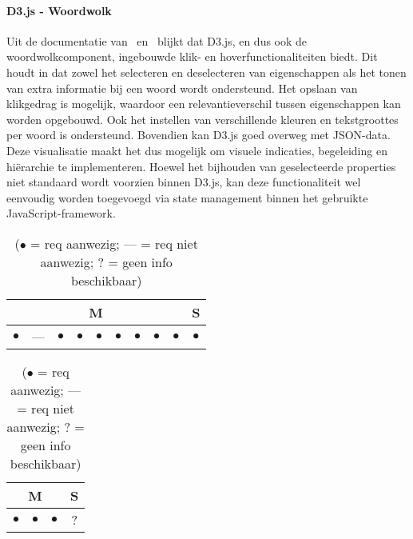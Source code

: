 \paragraph{D3.js - Woordwolk}
Uit de documentatie van~\textcite{D3Contributors2025} en~\textcite{Mike2025} blijkt dat D3.js, en dus ook de woordwolkcomponent, ingebouwde klik- en hoverfunctionaliteiten biedt. Dit houdt in dat zowel het selecteren en deselecteren van eigenschappen als het tonen van extra informatie bij een woord wordt ondersteund. Het opslaan van klikgedrag is mogelijk, waardoor een relevantieverschil tussen eigenschappen kan worden opgebouwd. Ook het instellen van verschillende kleuren en tekstgroottes per woord is ondersteund. Bovendien kan D3.js goed overweg met JSON-data. Deze visualisatie maakt het dus mogelijk om visuele indicaties, begeleiding en hiërarchie te implementeren. Hoewel het bijhouden van geselecteerde properties niet standaard wordt voorzien binnen D3.js, kan deze functionaliteit wel eenvoudig worden toegevoegd via state management binnen het gebruikte JavaScript-framework.

\begin{table}[htbp]
    \centering
    \begin{minipage}{0.48\textwidth}
        \centering
        \begin{tabular}{|ccccccccc|c|}
            \hline
            \multicolumn{9}{|c|}{M} & \multicolumn{1}{c|}{S} \\
            \midrule
            $\bullet$ & --- & $\bullet$ & $\bullet$ & $\bullet$ & $\bullet$ & $\bullet$ & $\bullet$ & $\bullet$ & $\bullet$ \\
            \bottomrule
        \end{tabular}
        \caption{D3.js Woordwolk - Functionele requirements}
    \end{minipage}
    \hfill
    \begin{minipage}{0.48\textwidth}
        \centering
        \begin{tabular}{|ccc|c|}
            \hline
            \multicolumn{3}{|c|}{M} & \multicolumn{1}{c|}{S} \\
            \midrule
            $\bullet$ & $\bullet$ & $\bullet$ & ? \\
            \bottomrule
        \end{tabular}
        \caption{D3.js Woordwolk - Niet-functionele requirements}
    \end{minipage}
    \caption*{($\bullet$ = req aanwezig; --- = req niet aanwezig; ? = geen info beschikbaar)}
\end{table}

